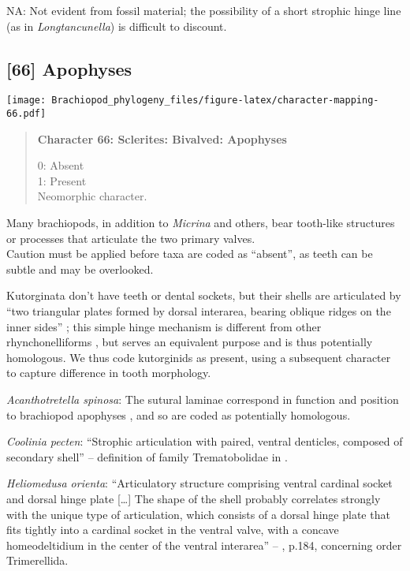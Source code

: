 \documentclass[openany]{book}
\theoremstyle{definition}
\theoremstyle{definition}
\theoremstyle{definition}
\theoremstyle{remark}
\begin{document}
\hypertarget{NA-coding-65}{}
NA: Not evident from fossil material; the possibility of a short
strophic hinge line (as in \emph{Longtancunella}) is difficult to
discount.

\subsection*{{[}66{]} Apophyses}\label{apophyses}

\texttt{[image: Brachiopod\_phylogeny\_files/figure-latex/character-mapping-66.pdf]}

\begin{quote}
\textbf{Character 66: Sclerites: Bivalved: Apophyses}

0: Absent\\
1: Present\\
Neomorphic character.
\end{quote}

Many brachiopods, in addition to \emph{Micrina} and others, bear
tooth-like structures or processes that articulate the two primary
valves.\\
Caution must be applied before taxa are coded as ``absent'', as teeth
can be subtle and may be overlooked.

Kutorginata don't have teeth or dental sockets, but their shells are
articulated by ``two triangular plates formed by dorsal interarea,
bearing oblique ridges on the inner sides''
\citep[p.~211]{Williams2000LinguliformeaCraniiformea}; this simple hinge
mechanism is different from other rhynchonelliforms
\citep[p.208]{Williams2000LinguliformeaCraniiformea}, but serves an
equivalent purpose and is thus potentially homologous. We thus code
kutorginids as present, using a subsequent character to capture
difference in tooth morphology.

\hypertarget{Acanthotretella_spinosa-coding-66}{}
\emph{Acanthotretella spinosa}: The sutural laminae correspond in
function and position to brachiopod apophyses \citep{Connors2012}, and
so are coded as potentially homologous.

\hypertarget{Coolinia_pecten-coding-66}{}
\emph{Coolinia pecten}: ``Strophic articulation with paired, ventral
denticles, composed of secondary shell'' -- definition of family
Trematobolidae in \citet{Williams2000LinguliformeaCraniiformea}.

\hypertarget{Heliomedusa_orienta-coding-66}{}
\emph{Heliomedusa orienta}: ``Articulatory structure comprising ventral
cardinal socket and dorsal hinge plate {[}\ldots{}{]} The shape of the
shell probably correlates strongly with the unique type of articulation,
which consists of a dorsal hinge plate that fits tightly into a cardinal
socket in the ventral valve, with a concave homeodeltidium in the center
of the ventral interarea'' --
\citet{Williams2000LinguliformeaCraniiformea}, p.184, concerning order
Trimerellida.
\end{document}
